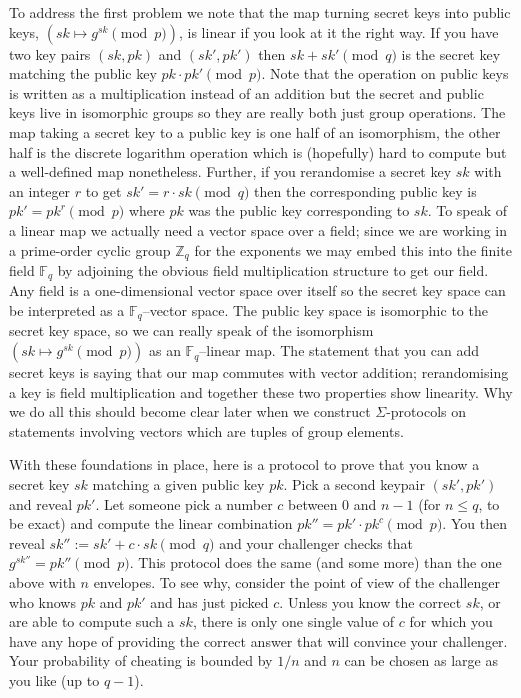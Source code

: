 \documentclass{llncs}
\begin{document}
To address the first problem we note that the map turning secret keys into
public keys, $(sk \mapsto g^{sk} \pmod{p})$, is linear if you look at it the
right way. If you have two key pairs $(sk, pk)$ and $(sk', pk')$ then $sk + sk'
\pmod{q}$ is the secret key matching the public key $pk \cdot pk' \pmod{p}$.
Note that the operation on public keys is written as a multiplication instead of
an addition but the secret and public keys live in isomorphic groups so they are
really both just group operations. The map taking a secret key to a public key
is one half of an isomorphism, the other half is the discrete logarithm
operation which is (hopefully) hard to compute but a well-defined map
nonetheless. Further, if you rerandomise a secret key $sk$ with an integer $r$
to get $sk' = r \cdot sk \pmod{q}$ then the corresponding public key is $pk' =
pk^r \pmod{p}$ where $pk$ was the public key corresponding to $sk$.
To speak of a linear map we actually need a vector space over a field; since we
are working in a prime-order cyclic group $\mathbb Z_q$ for the exponents we may
embed this into the finite field $\mathbb F_q$ by adjoining the obvious field
multiplication structure to get our field. Any field is a one-dimensional vector
space over itself so the secret key space can be interpreted as a $\mathbb
F_q$--vector space. The public key space is isomorphic to the secret key space,
so we can really speak of the isomorphism $(sk \mapsto g^{sk} \pmod{p})$ as an
$\mathbb F_q$--linear map. The statement that you can add secret keys is saying
that our map commutes with vector addition; rerandomising a key is field
multiplication and together these two properties show linearity. Why we do all
this should become clear later when we construct $\Sigma$-protocols on
statements involving vectors which are tuples of group elements.

With these foundations in place, here is a protocol to prove that you know a
secret key $sk$ matching a given public key $pk$. Pick a second keypair $(sk',
pk')$ and reveal $pk'$. Let someone pick a number $c$ between $0$ and $n - 1$
(for $n \leq q$, to be exact) and compute the linear combination $pk'' = pk'
\cdot pk^c \pmod{p}$. You then reveal $sk'' := sk' + c \cdot sk \pmod{q}$ and
your challenger checks that $g^{sk''} = pk'' \pmod{p}$. This protocol does the
same (and some more) than the one above with $n$ envelopes. To see why, consider
the point of view of the challenger who knows $pk$ and $pk'$ and has just
picked $c$. Unless you know the correct $sk$, or are able to compute such a
$sk$, there is only one single value of $c$ for which you have any hope of
providing the correct answer that will convince your challenger. Your
probability of cheating is bounded by $1/n$ and $n$ can be chosen as large as
you like (up to $q-1$).
\end{document}
